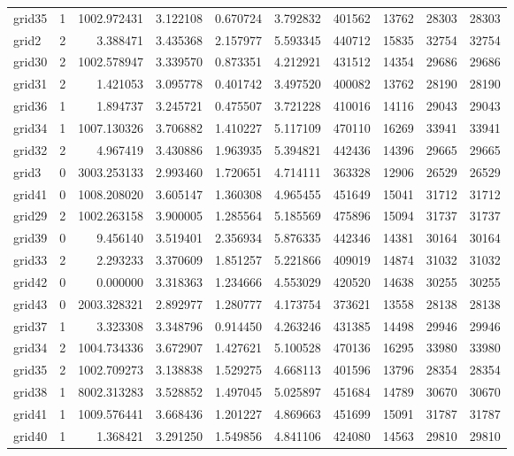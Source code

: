 \documentclass[../../../thesis.tex]{subfiles}
\begin{document}
\begin{longtable}{|l|r|r|r|r|r|r|r|r|r|}
grid35 & 1 & 1002.972431 & 3.122108 & 0.670724 & 3.792832 & 401562 & 13762 & 28303 & 28303 \\
grid2 & 2 & 3.388471 & 3.435368 & 2.157977 & 5.593345 & 440712 & 15835 & 32754 & 32754 \\
grid30 & 2 & 1002.578947 & 3.339570 & 0.873351 & 4.212921 & 431512 & 14354 & 29686 & 29686 \\
grid31 & 2 & 1.421053 & 3.095778 & 0.401742 & 3.497520 & 400082 & 13762 & 28190 & 28190 \\
grid36 & 1 & 1.894737 & 3.245721 & 0.475507 & 3.721228 & 410016 & 14116 & 29043 & 29043 \\
grid34 & 1 & 1007.130326 & 3.706882 & 1.410227 & 5.117109 & 470110 & 16269 & 33941 & 33941 \\
grid32 & 2 & 4.967419 & 3.430886 & 1.963935 & 5.394821 & 442436 & 14396 & 29665 & 29665 \\
grid3 & 0 & 3003.253133 & 2.993460 & 1.720651 & 4.714111 & 363328 & 12906 & 26529 & 26529 \\
grid41 & 0 & 1008.208020 & 3.605147 & 1.360308 & 4.965455 & 451649 & 15041 & 31712 & 31712 \\
grid29 & 2 & 1002.263158 & 3.900005 & 1.285564 & 5.185569 & 475896 & 15094 & 31737 & 31737 \\
grid39 & 0 & 9.456140 & 3.519401 & 2.356934 & 5.876335 & 442346 & 14381 & 30164 & 30164 \\
grid33 & 2 & 2.293233 & 3.370609 & 1.851257 & 5.221866 & 409019 & 14874 & 31032 & 31032 \\
grid42 & 0 & 0.000000 & 3.318363 & 1.234666 & 4.553029 & 420520 & 14638 & 30255 & 30255 \\
grid43 & 0 & 2003.328321 & 2.892977 & 1.280777 & 4.173754 & 373621 & 13558 & 28138 & 28138 \\
grid37 & 1 & 3.323308 & 3.348796 & 0.914450 & 4.263246 & 431385 & 14498 & 29946 & 29946 \\
grid34 & 2 & 1004.734336 & 3.672907 & 1.427621 & 5.100528 & 470136 & 16295 & 33980 & 33980 \\
grid35 & 2 & 1002.709273 & 3.138838 & 1.529275 & 4.668113 & 401596 & 13796 & 28354 & 28354 \\
grid38 & 1 & 8002.313283 & 3.528852 & 1.497045 & 5.025897 & 451684 & 14789 & 30670 & 30670 \\
grid41 & 1 & 1009.576441 & 3.668436 & 1.201227 & 4.869663 & 451699 & 15091 & 31787 & 31787 \\
grid40 & 1 & 1.368421 & 3.291250 & 1.549856 & 4.841106 & 424080 & 14563 & 29810 & 29810 \\

\end{longtable}
\end{document}
